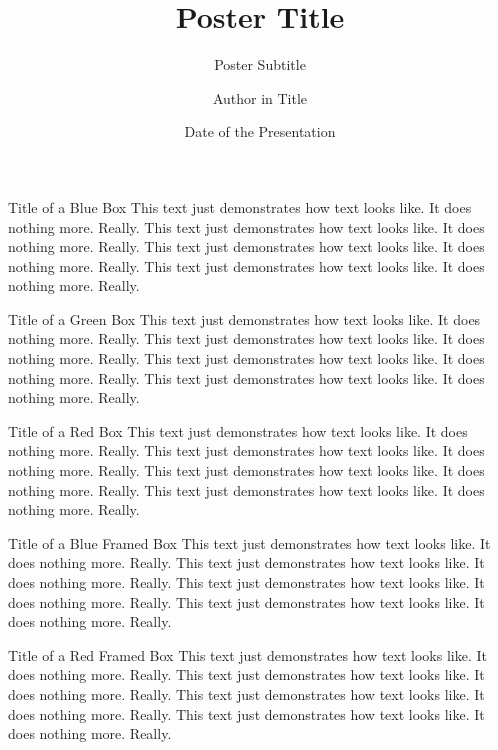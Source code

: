 \documentclass[cd=english,english,portrait]{univie-ling-poster}
\author[Author in Footline]{Author in Title}
\title{Poster Title}
\subtitle{Poster Subtitle}
\date{Date of the Presentation}
\begin{document}
\begin{frame}

\begin{bluebox}{Title of a Blue Box}
	This text just demonstrates how text looks like. It does nothing more. Really.
	This text just demonstrates how text looks like. It does nothing more. Really.
	This text just demonstrates how text looks like. It does nothing more. Really.
	This text just demonstrates how text looks like. It does nothing more. Really.
\end{bluebox}

\begin{greenbox}{Title of a Green Box}
	This text just demonstrates how text looks like. It does nothing more. Really.
	This text just demonstrates how text looks like. It does nothing more. Really.
	This text just demonstrates how text looks like. It does nothing more. Really.
	This text just demonstrates how text looks like. It does nothing more. Really.
\end{greenbox}


\begin{redbox}{Title of a Red Box}
	This text just demonstrates how text looks like. It does nothing more. Really.
	This text just demonstrates how text looks like. It does nothing more. Really.
	This text just demonstrates how text looks like. It does nothing more. Really.
	This text just demonstrates how text looks like. It does nothing more. Really.
\end{redbox}

\begin{blueframedbox}{Title of a Blue Framed Box}
	This text just demonstrates how text looks like. It does nothing more. Really.
	This text just demonstrates how text looks like. It does nothing more. Really.
	This text just demonstrates how text looks like. It does nothing more. Really.
	This text just demonstrates how text looks like. It does nothing more. Really.
\end{blueframedbox}

\begin{redframedbox}{Title of a Red Framed Box}
This text just demonstrates how text looks like. It does nothing more. Really.
This text just demonstrates how text looks like. It does nothing more. Really.
This text just demonstrates how text looks like. It does nothing more. Really.
This text just demonstrates how text looks like. It does nothing more. Really.
\end{redframedbox}


\end{frame}
\end{document}
